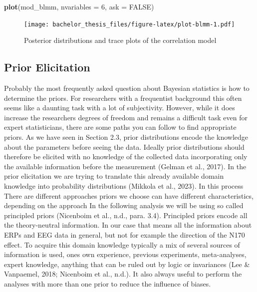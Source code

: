 \documentclass[
  doc,12pt,floatsintext]{apa7}
\newenvironment{Shaded}{\begin{snugshade}}{\end{snugshade}}
\newcommand{\AttributeTok}[1]{\textcolor[rgb]{0.13,0.29,0.53}{#1}}
\newcommand{\ConstantTok}[1]{\textcolor[rgb]{0.56,0.35,0.01}{#1}}
\newcommand{\DecValTok}[1]{\textcolor[rgb]{0.00,0.00,0.81}{#1}}
\newcommand{\FunctionTok}[1]{\textcolor[rgb]{0.13,0.29,0.53}{\textbf{#1}}}
\newcommand{\NormalTok}[1]{#1}
\begin{document}
\begin{Shaded}
\begin{Highlighting}[]
\FunctionTok{plot}\NormalTok{(mod\_blmm, }\AttributeTok{nvariables =} \DecValTok{6}\NormalTok{, }\AttributeTok{ask =} \ConstantTok{FALSE}\NormalTok{)}
\end{Highlighting}
\end{Shaded}

\begin{figure}
\centering
\texttt{[image: bachelor\_thesis\_files/figure-latex/plot-blmm-1.pdf]}
\caption{\label{fig:plot-blmm}Posterior distributions and trace plots of the correlation model}
\end{figure}

\subsection{Prior Elicitation}\label{prior-elicitation}

Probably the most frequently asked question about Bayesian statistics is how to determine the priors. For researchers with a frequentist background this often seems like a daunting task with a lot of subjectivity. However, while it does increase the researchers degrees of freedom and remains a difficult task even for expert statisticians, there are some paths you can follow to find appropriate priors. As we have seen in Section 2.3, prior distributions encode the knowledge about the parameters before seeing the data. Ideally prior distributions should therefore be elicited with no knowledge of the collected data incorporating only the available information before the measurement (Gelman et al., 2017). In the prior elicitation we are trying to translate this already available domain knowledge into probability distributions (Mikkola et al., 2023). In this process There are different approaches priors we choose can have different characteristics, depending on the approach In the following analysis we will be using so called principled priors (Nicenboim et al., n.d., para. 3.4). Principled priors encode all the theory-neutral information. In our case that means all the information about ERPs and EEG data in general, but not for example the direction of the N170 effect. To acquire this domain knowledge typically a mix of several sources of information is used, ones own experience, previous experiments, meta-analyses, expert knowledge, anything that can be ruled out by logic or invariances (Lee \& Vanpaemel, 2018; Nicenboim et al., n.d.). It also always useful to perform the analyses with more than one prior to reduce the influence of biases.
\end{document}
